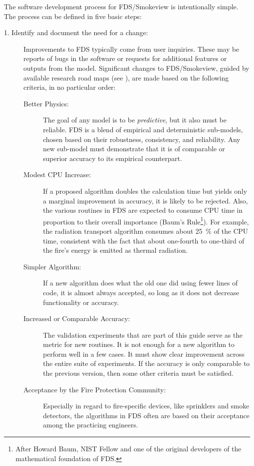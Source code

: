 \documentclass[11pt]{book}
\begin{document}
The software development process for FDS/Smokeview is intentionally simple. The process can be defined in five basic steps:
\begin{description}
\item [1. Identify and document the need for a change:] Improvements to FDS typically come from user inquiries. These may be reports of bugs in the software or requests for additional features or outputs from the model. Significant changes to FDS/Smokeview, guided by available research road maps \linebreak (see \href{https://pages.nist.gov/fds-smv} {}), are made based on the following criteria, in no particular order:
\begin{description}
\item[Better Physics:] The goal of any model is to be {\em predictive}, but it also must be reliable. FDS is a blend of empirical and deterministic sub-models, chosen based on their robustness, consistency, and reliability. Any new sub-model must demonstrate that it is of comparable or superior accuracy to its empirical counterpart.
\item[Modest CPU Increase:] If a proposed algorithm doubles the calculation time but yields only a marginal improvement in accuracy, it is likely to be rejected. Also, the various routines in FDS are expected to consume CPU time in proportion to their overall importance (Baum's Rule\footnote{After Howard Baum, NIST Fellow and one of the original developers of the mathematical foundation of FDS.}). For example, the radiation transport algorithm consumes about 25~\% of the CPU time, consistent with the fact that about one-fourth to one-third of the fire's energy is emitted as thermal radiation.
\item[Simpler Algorithm:] If a new algorithm does what the old one did using fewer lines of code, it is almost always accepted, so long as it does not decrease functionality or accuracy.
\item[Increased or Comparable Accuracy:] The validation experiments that are part of this guide serve as the metric for new routines. It is not enough for a new algorithm to perform well in a few cases. It must show clear improvement across the entire suite of experiments. If the accuracy is only comparable to the previous version, then some other criteria must be satisfied.
\item[Acceptance by the Fire Protection Community:] Especially in regard to fire-specific devices, like sprinklers and smoke detectors, the algorithms in FDS often are based on their acceptance among the practicing engineers.

\end{description}
\end{description}
\end{document}

